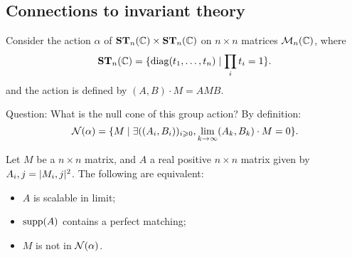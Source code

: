 \subsection{Connections to invariant theory}

Consider the action $\alpha$ of $\ST[n]{\complexN}\times \ST[n]{\complexN}$ on $n\times n$ matrices $\matrices[n]{\complexN}$, where
\[ \ST[n]{\complexN} = \{ \diag{t_1,\dots, t_n} \mid \prod_i t_i=1\}. \]
and the action is defined by $(A,B)\cdot M = AMB$.

Question: What is the null cone of this group action? By definition:
\[ \nullcone{\alpha} = \{ M \mid \exists ((A_i,B_i))_{i\geqslant 0}, \lim_{k\rightarrow \infty} (A_k, B_k)\cdot M = 0 \}. \]
 
\begin{theorem}
 Let $M$ be a $n\times n$ matrix, and $A$ a real positive $n\times n$ matrix given by $A_i,j = \abs{M_i,j}^2$. The following are equivalent:
 \begin{itemize}
 \item $A$ is scalable in limit;
 \item $\supp{A}$ contains a perfect matching;
 \item $M$ is not in $\nullcone{\alpha}$.
 \end{itemize}
 \end{theorem}
 
